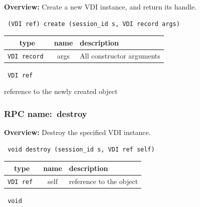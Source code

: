 {\bf Overview:} 
Create a new VDI instance, and return its handle.

\begin{verbatim} (VDI ref) create (session_id s, VDI record args)\end{verbatim}



 
\vspace{0.3cm}
\begin{tabular}{|c|c|p{7cm}|}
 \hline
{\bf type} & {\bf name} & {\bf description} \\ \hline
{\tt VDI record } & args & All constructor arguments \\ \hline 

\end{tabular}

\vspace{0.3cm}

{\tt 
VDI ref
}


reference to the newly created object
\vspace{0.3cm}
\vspace{0.3cm}
\vspace{0.3cm}
\subsubsection{RPC name:~destroy}

{\bf Overview:} 
Destroy the specified VDI instance.

\begin{verbatim} void destroy (session_id s, VDI ref self)\end{verbatim}



 
\vspace{0.3cm}
\begin{tabular}{|c|c|p{7cm}|}
 \hline
{\bf type} & {\bf name} & {\bf description} \\ \hline
{\tt VDI ref } & self & reference to the object \\ \hline 

\end{tabular}

\vspace{0.3cm}

{\tt 
void
}



\vspace{0.3cm}
\vspace{0.3cm}
\vspace{0.3cm}
